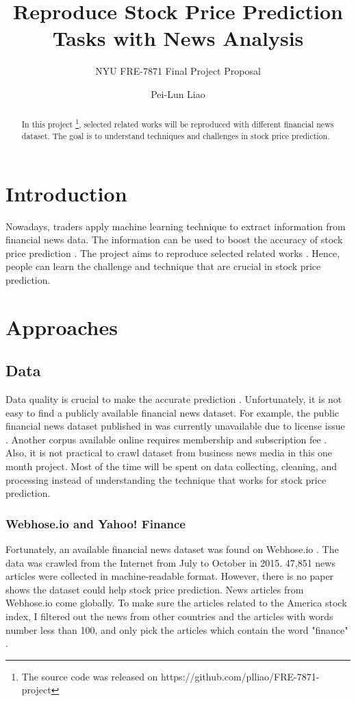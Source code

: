 \documentclass[sigconf]{acmart}
\begin{document}
\title{Reproduce Stock Price Prediction Tasks with News Analysis}
\subtitle{NYU FRE-7871 Final Project Proposal}

\author{Pei-Lun Liao}

\begin{abstract}
In this project \footnote{The source code was released on https://github.com/plliao/FRE-7871-project}, selected related works will be reproduced with different financial news dataset. The goal is to understand techniques and challenges in stock price prediction.
\end{abstract}
\maketitle

\section{Introduction}
Nowadays, traders apply machine learning technique to extract information from financial news data. The information can be used to boost the accuracy of stock price
prediction \cite{AZFinText, Ding2014, Ding2015}. The project aims to reproduce selected related works \cite{AZFinText}. Hence, people can learn the challenge and technique
that are crucial in stock price prediction.

\section{Approaches}
\subsection{Data}
Data quality is crucial to make the accurate prediction \cite{stanford}. Unfortunately, it is not easy to find a publicly available financial news dataset. For example, the public financial
news dataset published in \cite{Ding2014} was currently unavailable due to license issue \cite{fn}. Another corpus available online requires membership and subscription fee \cite{nyt}.
Also, it is not practical to crawl dataset from business news media in this one month project. Most of the time will be spent on data collecting, cleaning, and processing instead of
understanding the technique that works for stock price prediction.

\subsubsection{Webhose.io and Yahoo! Finance}
Fortunately, an available financial news dataset was found on Webhose.io \cite{data}. The data was crawled from the Internet from July to October in 2015. 47,851 news articles were collected
in machine-readable format. However, there is no paper shows the dataset could help stock price prediction. News articles from Webhose.io come globally. To make sure the articles related to the
America stock index, I filtered out the news from other countries and the articles with words number less than 100, and only pick the articles which contain the word "finance" \cite{stanford}.  
\end{document}
